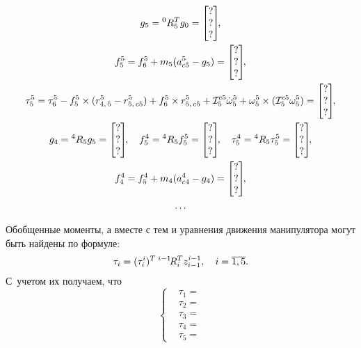 \begin{gather}
    g_5= {}^0R_5^T g_0 =
    \begin{bmatrix}
        ? \\ ? \\ ?
    \end{bmatrix}\!\!,
    \\
    f^5_5 = f^5_{6} + m_5(a^5_{c5} - g_5) =
    \begin{bmatrix}
        ? \\ ? \\ ?
    \end{bmatrix}\!\!,
    \\
    \tau^5_5 = \tau^5_6 - f^5_5\times(r^5_{4,\,5} - r^5_{5,\,c5}) + f^5_6 \times r^5_{5,\,c5} + \mathcal{I}^{c5}_5\dot\omega^5_5 + \omega_5^5\times(\mathcal{I}^{c5}_5\omega_5^5) =
    \begin{bmatrix}
        ? \\ ? \\ ?
    \end{bmatrix}\!\!,
    \\
    g_4 = {}^4R_5g_5 =
    \begin{bmatrix}
        ? \\ ? \\ ?
    \end{bmatrix}\!\!,
    \quad
    f^4_5 = {}^{4}R_5f^5_5 =
    \begin{bmatrix}
        ? \\ ? \\ ?
    \end{bmatrix}\!\!,
    \quad
    \tau^4_5 = {}^{4}R_5\tau^5_5 =
    \begin{bmatrix}
        ? \\ ? \\ ?
    \end{bmatrix}\!\!,
    \\
    f^4_4 = f^4_{5} + m_4(a^4_{c4} - g_4) =
    \begin{bmatrix}
        ? \\ ? \\ ?
    \end{bmatrix}\!\!,
    \\
    \ldots \notag
\end{gather}

Обобщенные моменты, а вместе с тем и уравнения движения манипулятора могут быть найдены по формуле:
\begin{equation}
    \tau_i = (\tau^i_i)^T \: {}^{i-1}\!R_i^T z^{i-1}_{i-1}	, \quad i = \overline{1,5}\ldotp
\end{equation}
С~учетом их получаем, что
\begin{equation}\label{eq_system_of_equations_2}
	\left\{
	\begin{aligned}
		\!&\tau_1 = \\
		\!&\tau_2 = \\
		\!&\tau_3 = \\
		\!&\tau_4 = \\
		\!&\tau_5 =
	\end{aligned}
	\right.
\end{equation}

